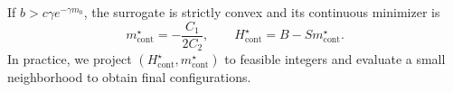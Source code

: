 If $b>c\gamma e^{-\gamma m_0}$, the surrogate is strictly convex and its continuous minimizer is
\begin{equation}
m_{\mathrm{cont}}^{\star}=-\frac{C_1}{2C_2},
\qquad
H_{\mathrm{cont}}^{\star}=B-Sm_{\mathrm{cont}}^{\star}.
\end{equation}
In practice, we project $(H_{\mathrm{cont}}^{\star},m_{\mathrm{cont}}^{\star})$ to feasible integers and evaluate a small neighborhood to obtain final configurations.